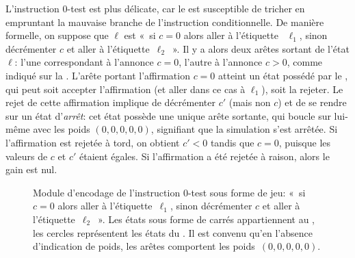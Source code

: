 L'instruction $0$-test est plus délicate, car le \jo est susceptible de tricher en empruntant la mauvaise branche de l'instruction conditionnelle.
De manière formelle, on suppose que $\ell$ est « si $c=0$ alors aller à l'étiquette~ $\ell_1$, sinon décrémenter $c$ et aller à l'étiquette~$\ell_2$ ».
Il y a alors deux arêtes sortant de l'état $\ell$: l'une correspondant à l'annonce $c=0$, l'autre à l'annonce $c>0$, comme indiqué sur la .
L'arête portant l'affirmation $c=0$ atteint un état possédé par le \ji, qui peut soit accepter l'affirmation (et aller dans ce cas à $\ell_1$), soit la rejeter.
Le rejet de cette affirmation implique de décrémenter $c'$ (mais non $c$) et de se rendre sur un état d'\emph{arrêt}: cet état possède une unique arête sortante, qui boucle sur lui-même avec les poids $(0,0,0,0,0)$, signifiant que la simulation s'est arrêtée.
Si l'affirmation est rejetée à tord, on obtient $c'<0$ tandis que $c=0$, puisque les valeurs de $c$ et $c'$ étaient égales.
Si l'affirmation a été rejetée à raison, alors le gain est nul.

\begin{figure}
\centering
{}
\caption[Module d'encodage de l'instruction $0$-test sous forme de jeu.]{Module d'encodage de l'instruction $0$-test sous forme de jeu: « si $c=0$ alors aller à l'étiquette~$\ell_1$, sinon décrémenter $c$ et aller à l'étiquette~$\ell_2$ ». Les états sous forme de carrés appartiennent au \jo, les cercles représentent les états du \ji. Il est convenu qu'en l'absence d'indication de poids, les arêtes comportent les poids~$(0,0,0,0,0)$.}
\label{tj:fig:zerotest}
\end{figure}


